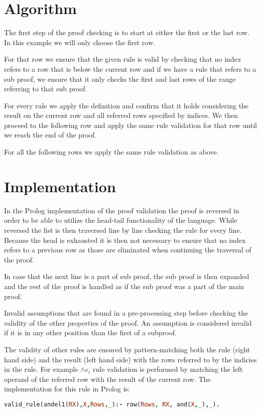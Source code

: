 \documentclass[a4paper,11pt]{article}
\begin{document}
\section{Algorithm}
The first step of the proof checking is to start at either the first or the last row. In this example we will only choose the first row.

For that row we ensure that the given rule is valid by checking that no index refers to a row that is below the current row and if we have a rule that refers to a sub proof, we ensure that it only checks the first and last rows of the range referring to that sub proof.

For every rule we apply the definition and confirm that it holds considering the result on the current row and all referred rows specified by indices. We then proceed to the following row and apply the same rule validation for that row until we reach the end of the proof.

For all the following rows we apply the same rule validation as above.
\section{Implementation}
In the Prolog implementation of the proof validation the proof is reversed in order to be able to utilize the head-tail functionality of the language. While reversed the list is then traversed line by line checking the rule for every line. Because the head is exhausted it is then not necessary to ensure that no index refers to a previous row as those are eliminated when continuing the traversal of the proof.

In case that the next line is a part of sub proof, the sub proof is then expanded and the rest of the proof is handled as if the sub proof was a part of the main proof.

Invalid assumptions that are found in a pre-processing step before checking the validity of the other properties of the proof. An assumption is considered invalid if it is in any other position than the first of a subproof.

The validity of other rules are ensured by pattern-matching both the rule (right hand side) and the result (left hand side) with the rows referred to by the indicies in the rule. For example $\land e_i$ rule validation is performed by matching the left operand of the referred row with the result of the current row. The implementation for this rule in Prolog is:
\begin{lstlisting}[frame=single,language=Prolog]
%signature: valid_rule(Rule,Result,Rows,Premises). 
valid_rule(andel1(RX),X,Rows,_):- row(Rows, RX, and(X,_),_).
\end{lstlisting}
\end{document}
